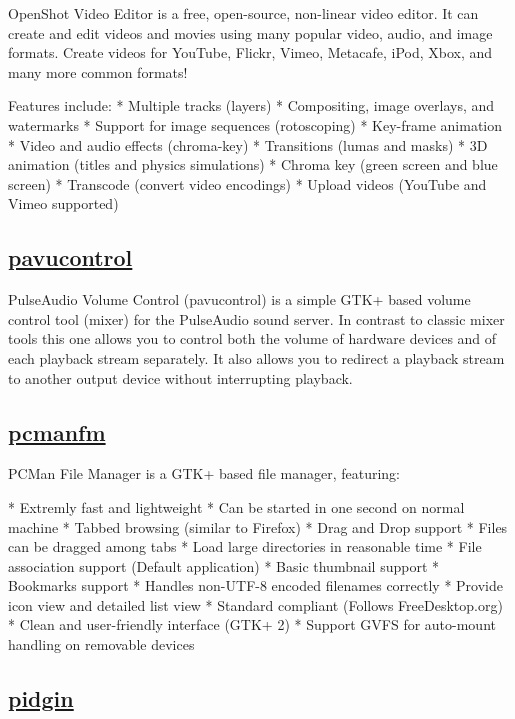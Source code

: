  OpenShot Video Editor is a free, open-source, non-linear video editor. It
 can create and edit videos and movies using many popular video, audio, and
 image formats. Create videos for YouTube, Flickr, Vimeo, Metacafe, iPod,
 Xbox, and many more common formats!
 
 Features include:
  * Multiple tracks (layers)
  * Compositing, image overlays, and watermarks
  * Support for image sequences (rotoscoping)
  * Key-frame animation
  * Video and audio effects (chroma-key)
  * Transitions (lumas and masks)
  * 3D animation (titles and physics simulations)
  * Chroma key (green screen and blue screen)
  * Transcode (convert video encodings)
  * Upload videos (YouTube and Vimeo supported)

\subsection{\href{http://0pointer.de/lennart/projects/pavucontrol/}{pavucontrol}}

 PulseAudio Volume Control (pavucontrol) is a simple GTK+ based volume
 control tool (mixer) for the PulseAudio sound server. In contrast to
 classic mixer tools this one allows you to control both the volume of
 hardware devices and of each playback stream separately. It also allows
 you to redirect a playback stream to another output device without
 interrupting playback.

\subsection{\href{http://pcmanfm.sourceforge.net/}{pcmanfm}}

 PCMan File Manager is a GTK+ based file manager, featuring:
 
  * Extremly fast and lightweight
  * Can be started in one second on normal machine
  * Tabbed browsing (similar to Firefox)
  * Drag and Drop support
  * Files can be dragged among tabs
  * Load large directories in reasonable time
  * File association support (Default application)
  * Basic thumbnail support
  * Bookmarks support
  * Handles non-UTF-8 encoded filenames correctly
  * Provide icon view and detailed list view
  * Standard compliant (Follows FreeDesktop.org)
  * Clean and user-friendly interface (GTK+ 2)
  * Support GVFS for auto-mount handling on removable devices

\subsection{\href{http://www.pidgin.im}{pidgin}}

